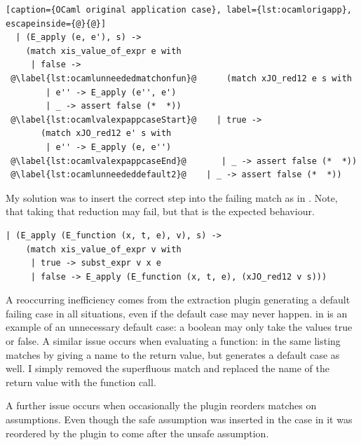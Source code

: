 \documentclass[12pt,twoside,notitlepage]{report}
\theoremstyle{plain}%
\theoremstyle{definition}
\theoremstyle{remark}
\begin{document}
\begin{minipage}{\linewidth}

\begin{lstlisting}[caption={OCaml original application case}, label={lst:ocamlorigapp}, escapeinside={@}{@}]
  | (E_apply (e, e'), s) ->
    (match xis_value_of_expr e with
     | false ->
 @\label{lst:ocamlunneededmatchonfun}@      (match xJO_red12 e s with
        | e'' -> E_apply (e'', e')
        | _ -> assert false (*  *))
 @\label{lst:ocamlvalexpappcaseStart}@    | true ->
       (match xJO_red12 e' s with
        | e'' -> E_apply (e, e'')
 @\label{lst:ocamlvalexpappcaseEnd}@       | _ -> assert false (*  *))
 @\label{lst:ocamlunneededdefault2}@    | _ -> assert false (*  *))
\end{lstlisting}

\end{minipage}
My solution was to insert the correct step into the failing match as in . Note, that taking that reduction may fail, but that is the expected behaviour.


\vspace{3mm}
\begin{minipage}{\linewidth}

\begin{lstlisting}[caption={OCaml fixed substitution case}, label={lst:ocamlfixsub}]
  | (E_apply (E_function (x, t, e), v), s) ->
    (match xis_value_of_expr v with
     | true -> subst_expr v x e
     | false -> E_apply (E_function (x, t, e), (xJO_red12 v s)))
\end{lstlisting}

\end{minipage}
A reoccurring inefficiency comes from the extraction plugin generating a default failing case in all situations, even if the default case may never happen.  in  is an example of an unnecessary default case: a boolean may only take the values true or false. A similar issue occurs when evaluating a function:   in the same listing matches by giving a name to the return value, but generates a default case as well. I simply removed the superfluous match and replaced the name of the return value with the function call.

A further issue occurs when occasionally the plugin reorders matches on assumptions. Even though the safe assumption was inserted in the case in  it was reordered by the plugin to come after the unsafe assumption.\vspace{2mm}
\end{document}
